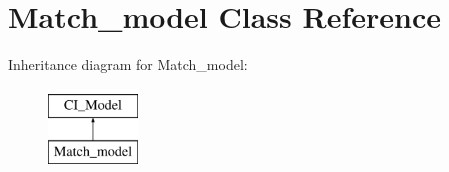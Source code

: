 \hypertarget{class_match__model}{}\section{Match\+\_\+model Class Reference}
\label{class_match__model}
Inheritance diagram for Match\+\_\+model\+:\begin{figure}[H]
\begin{center}
\leavevmode
\includegraphics[height=2.000000cm]{class_match__model}
\end{center}
\end{figure}
